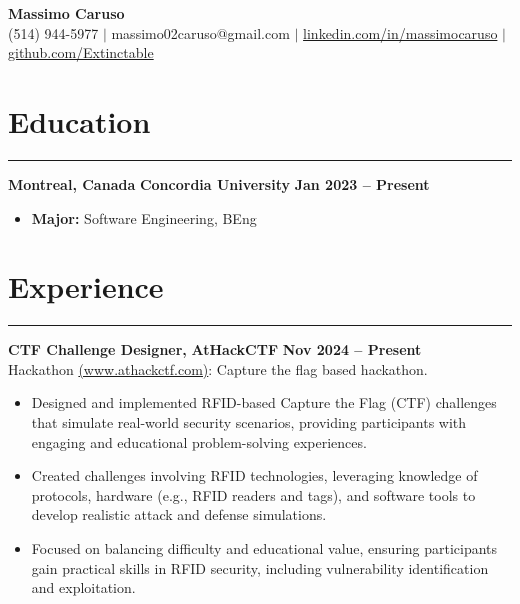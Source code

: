 \documentclass[10pt]{article}
\begin{document}
\begin{center}
    {\Huge \textbf{Massimo Caruso}} \\
    \vspace{1mm}
    {\small (514) 944-5977 $\vert$ massimo02caruso@gmail.com $\vert$ \href{https://linkedin.com/in/massimocaruso}{linkedin.com/in/massimocaruso} $\vert$ \href{https://github.com/Extinctable}{github.com/Extinctable}}
\end{center}

\vspace{-8mm}

\section*{Education}
\vspace{-2mm}
\hrule
\vspace{0mm}

\textbf{Montreal, Canada} \hfill \textbf{Concordia University} \hfill \textbf{Jan 2023 -- Present} 
\vspace{-4mm}
\begin{itemize}[left=0.15in, itemsep=0pt]
    \item \textbf{Major:} Software Engineering, BEng
\end{itemize}

\section*{Experience}
\vspace{-2mm}
\hrule
\vspace{0mm}

\textbf{CTF Challenge Designer, } \hfill \textbf{AtHackCTF} \hfill \textbf{Nov 2024 -- Present} \\
{Hackathon {\href{https://www.athackctf.com}{(www.athackctf.com)}: Capture the flag based hackathon.}}
\vspace{-4mm}
\begin{itemize}[left=0.15in, itemsep=0pt]
    \item Designed and implemented RFID-based Capture the Flag (CTF) challenges that simulate real-world security scenarios, providing participants with engaging and educational problem-solving experiences.
    \item Created challenges involving RFID technologies, leveraging knowledge of protocols, hardware (e.g., RFID readers and tags), and software tools to develop realistic attack and defense simulations.
    \item Focused on balancing difficulty and educational value, ensuring participants gain practical skills in RFID security, including vulnerability identification and exploitation.
\end{itemize}
\end{document}
